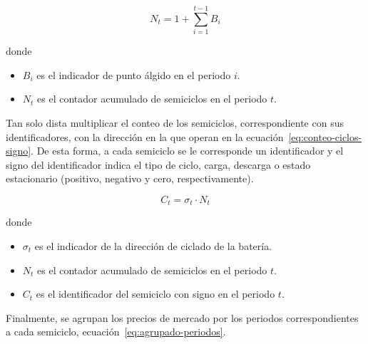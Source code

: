 \begin{samepage}

  \begin{equation}
    \label{eq:conteo-ciclos}
    N_{t} = 1 + \sum_{i = 1}^{t - 1} B_{i}
  \end{equation}

  donde

  \begin{itemize}

    \item \( B_{i} \) es el indicador de punto álgido en el periodo \( i \).

    \item \( N_{t} \) es el contador acumulado de semiciclos en el periodo \( t \).

  \end{itemize}

\end{samepage}

Tan solo dista multiplicar el conteo de los semiciclos, correspondiente con sus identificadores, con la dirección en la que operan en la ecuación~\ref{eq:conteo-ciclos-signo}. De esta forma, a cada semiciclo se le corresponde un identificador y el signo del identificador indica el tipo de ciclo, carga, descarga o estado estacionario (positivo, negativo y cero, respectivamente).

\begin{samepage}

  \begin{equation}
    \label{eq:conteo-ciclos-signo}
    C_{t} = \sigma_{t} \cdot N_{t}
  \end{equation}

  donde

  \begin{itemize}

    \item \( \sigma_{t} \) es el indicador de la dirección de ciclado de la batería.

    \item \( N_{t} \) es el contador acumulado de semiciclos en el periodo \( t \).

    \item \( C_{t} \) es el identificador del semiciclo con signo en el periodo \( t \).

  \end{itemize}

\end{samepage}

Finalmente, se agrupan los precios de mercado por los periodos correspondientes a cada semiciclo, ecuación~\ref{eq:agrupado-periodos}.

